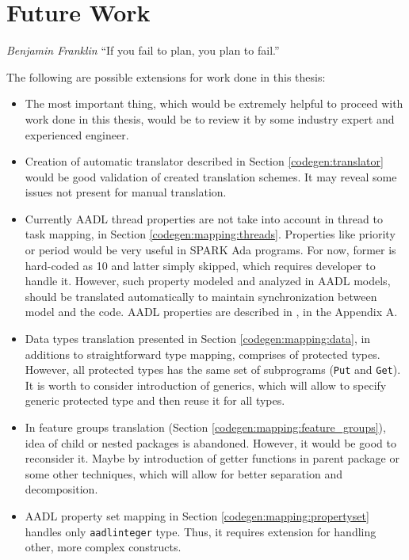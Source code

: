 
\cleardoublepage

\chapter{Future Work}
\label{future_work}

\begin{chapquote}{\textit{Benjamin Franklin}}
``If you fail to plan, you plan to fail.''
\end{chapquote}

The following are possible extensions for work done in this thesis:

\begin{itemize}
	\item The most important thing, which would be extremely helpful to proceed with work done in this thesis, would be to review it by some industry expert and experienced engineer.
	\item Creation of automatic translator described in Section \ref{codegen:translator} would be good validation of created translation schemes. It may reveal some issues not present for manual translation.
	\item Currently AADL thread properties are not take into account in thread to task mapping, in Section \ref{codegen:mapping:threads}. Properties like priority or period would be very useful in SPARK Ada programs. For now, former is hard-coded as 10 and latter simply skipped, which requires developer to handle it. However, such property modeled and analyzed in AADL models, should be translated automatically to maintain synchronization between model and the code. AADL properties are described in \cite{AadlBook}, in the Appendix A.
	\item Data types translation presented in Section \ref{codegen:mapping:data}, in additions to straightforward type mapping, comprises of protected types. However, all protected types has the same set of subprograms (\lstinline{Put} and \lstinline{Get}). It is worth to consider introduction of generics, which will allow to specify generic protected type and then reuse it for all types.
	\item In feature groups translation (Section \ref{codegen:mapping:feature_groups}), idea of child or nested packages is abandoned. However, it would be good to reconsider it. Maybe by introduction of getter functions in parent package or some other techniques, which will allow for better separation and decomposition.
	\item AADL property set mapping in Section \ref{codegen:mapping:propertyset} handles only \lstinline{aadlinteger} type. Thus, it requires extension for handling other, more complex constructs.

\end{itemize}
